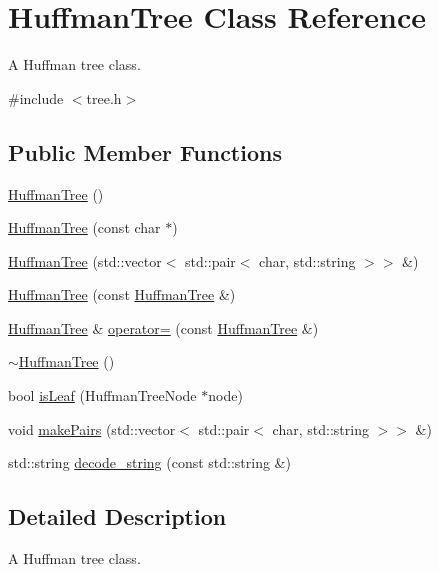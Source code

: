 \hypertarget{class_huffman_tree}{}\section{Huffman\+Tree Class Reference}
\label{class_huffman_tree}


A Huffman tree class.  




{\ttfamily \#include $<$tree.\+h$>$}

\subsection*{Public Member Functions}
\begin{DoxyCompactItemize}
\item 
\hyperlink{class_huffman_tree_a69699f7de5cfcd69e741f72ecb2b043d}{Huffman\+Tree} ()
\item 
\hyperlink{class_huffman_tree_a666b0956e40438a6130f31933271f6c6}{Huffman\+Tree} (const char $\ast$)
\item 
\hyperlink{class_huffman_tree_a610ac7959bfcf17c8a3c02cd9280ef61}{Huffman\+Tree} (std\+::vector$<$ std\+::pair$<$ char, std\+::string $>$$>$ \&)
\item 
\hyperlink{class_huffman_tree_a19a9e458233f8dd7ed99252be797bbd3}{Huffman\+Tree} (const \hyperlink{class_huffman_tree}{Huffman\+Tree} \&)
\item 
\hyperlink{class_huffman_tree}{Huffman\+Tree} \& \hyperlink{class_huffman_tree_a1274cfce54e9bb66af77bff91aa71411}{operator=} (const \hyperlink{class_huffman_tree}{Huffman\+Tree} \&)
\item 
\hyperlink{class_huffman_tree_a1c39382be4e786a99a07183bbee3830d}{$\sim$\+Huffman\+Tree} ()
\item 
bool \hyperlink{class_huffman_tree_acf3a39b33e82f22f88436e6b99809761}{is\+Leaf} (Huffman\+Tree\+Node $\ast$node)
\item 
void \hyperlink{class_huffman_tree_aad4e7b29b81e1b64d1eb48a3bd70747f}{make\+Pairs} (std\+::vector$<$ std\+::pair$<$ char, std\+::string $>$$>$ \&)
\item 
std\+::string \hyperlink{class_huffman_tree_a9089821533c4ef5b1ac5a4f689757603}{decode\+\_\+string} (const std\+::string \&)
\end{DoxyCompactItemize}


\subsection{Detailed Description}
A Huffman tree class. 


